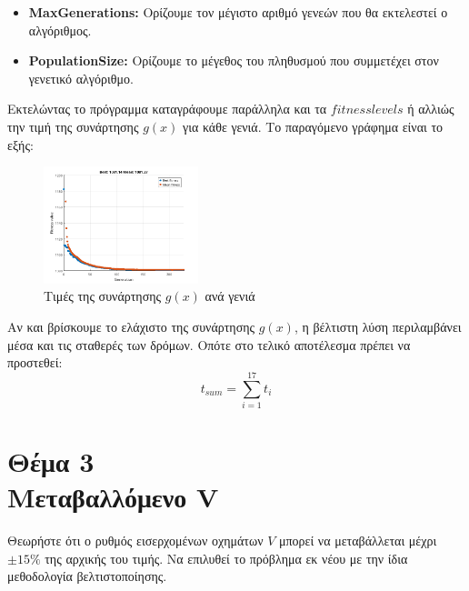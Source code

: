 \documentclass[twocolumn]{report}
\begin{document}
\begin{itemize}
    \item {}\textbf{MaxGenerations:}
    Ορίζουμε τον μέγιστο αριθμό γενεών που θα εκτελεστεί ο αλγόριθμος.

    \item {}\textbf{PopulationSize:}
    Ορίζουμε το μέγεθος του πληθυσμού που συμμετέχει στον γενετικό αλγόριθμο.
\end{itemize}
Εκτελώντας το πρόγραμμα καταγράφουμε παράλληλα και τα $fitness levels$ ή αλλιώς την
τιμή της συνάρτησης $g(x)$ για κάθε γενιά. Το παραγόμενο γράφημα είναι το εξής:
\begin{figure}[H]
    \centering
    \includegraphics[width=0.4\textwidth]{media/plotV.png}
    \caption{Τιμές της συνάρτησης $g(x)$ ανά γενιά}
\end{figure}
Αν και βρίσκουμε το ελάχιστο της συνάρτησης $g(x)$, η βέλτιστη λύση περιλαμβάνει μέσα και 
τις σταθερές των δρόμων. Οπότε στο τελικό αποτέλεσμα πρέπει να προστεθεί:
$$t_{sum} = \sum_{i=1}^{17} t_i$$

\section*{Θέμα 3\\Μεταβαλλόμενο V}
Θεωρήστε ότι ο ρυθμός εισερχομένων οχημάτων $V$ μπορεί να μεταβάλλεται μέχρι 
$\pm 15\%$ της αρχικής του τιμής. Να επιλυθεί το πρόβλημα εκ νέου με 
την ίδια μεθοδολογία βελτιστοποίησης. 
\end{document}
